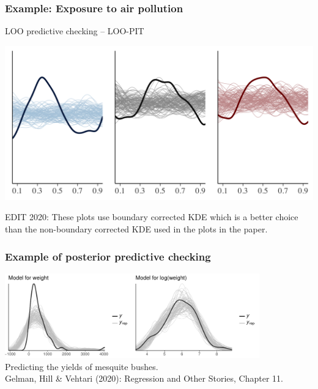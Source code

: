 \documentclass[10pt,handout]{beamer}
\begin{document}
\begin{frame}
\begin{figure}
\end{figure}

\end{frame}



\begin{frame}

\frametitle{Example: Exposure to air pollution}


  LOO predictive checking -- LOO-PIT

\includegraphics[width=\textwidth]{figs/ppc_loo_pit_corrected_pm25.png}



\vspace{2\baselineskip}
{\scriptsize EDIT 2020: These plots use boundary corrected KDE which is a better choice than the non-boundary corrected KDE used in the plots in the
paper.}

\end{frame}

\begin{frame}[fragile]

\frametitle{Example of posterior predictive checking}

    \includegraphics[width=11cm]{figs/mesquite_ppc.pdf}\\
  \vspace{-0.1\baselineskip} {Predicting the yields of mesquite bushes.\\
    \color{gray} \footnotesize
    Gelman, Hill \& Vehtari (2020): Regression and Other Stories, Chapter 11.}\\

\end{frame}
\end{document}
